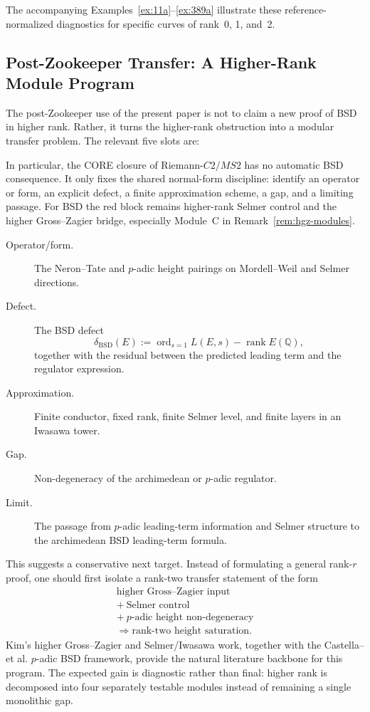 \documentclass[aps,prd,twocolumn,superscriptaddress,nofootinbib,floatfix]{revtex4-2}
\theoremstyle{definition}
\theoremstyle{remark}
\begin{document}
The accompanying Examples~\ref{ex:11a}--\ref{ex:389a} illustrate these reference-normalized diagnostics for specific curves of rank~0, 1, and~2.

\subsection{Post-Zookeeper Transfer: A Higher-Rank Module Program}
\label{subsec:zookeeper-bsd-transfer}

The post-Zookeeper use of the present paper is not to claim a new proof of
BSD in higher rank.  Rather, it turns the higher-rank obstruction into a
modular transfer problem.  The relevant five slots are:

In particular, the CORE closure of Riemann-$C2/MS2$ has no automatic BSD
consequence.  It only fixes the shared normal-form discipline: identify an
operator or form, an explicit defect, a finite approximation scheme, a
gap, and a limiting passage.  For BSD the red block remains higher-rank
Selmer control and the higher Gross--Zagier bridge, especially Module~C in
Remark~\ref{rem:hgz-modules}.

\begin{description}
  \item[Operator/form.] The Neron--Tate and $p$-adic height pairings on
  Mordell--Weil and Selmer directions.
  \item[Defect.] The BSD defect
  \[
    \delta_{\mathrm{BSD}}(E)
      := \operatorname{ord}_{s=1}L(E,s)-\operatorname{rank}E(\mathbb{Q}),
  \]
  together with the residual between the predicted leading term and the
  regulator expression.
  \item[Approximation.] Finite conductor, fixed rank, finite Selmer level,
  and finite layers in an Iwasawa tower.
  \item[Gap.] Non-degeneracy of the archimedean or $p$-adic regulator.
  \item[Limit.] The passage from $p$-adic leading-term information and
  Selmer structure to the archimedean BSD leading-term formula.
\end{description}

This suggests a conservative next target.  Instead of formulating a
general rank-$r$ proof, one should first isolate a rank-two transfer
statement of the form
\[
\begin{gathered}
  \text{higher Gross--Zagier input}\\
  +\ \text{Selmer control}\\
  +\ \text{$p$-adic height non-degeneracy}\\
  \Longrightarrow \text{rank-two height saturation}.
\end{gathered}
\]
Kim's higher Gross--Zagier and Selmer/Iwasawa work, together with the
Castella--et al. $p$-adic BSD framework, provide the natural literature
backbone for this program.  The expected gain is diagnostic rather than
final: higher rank is decomposed into four separately testable modules
instead of remaining a single monolithic gap.
\end{document}

